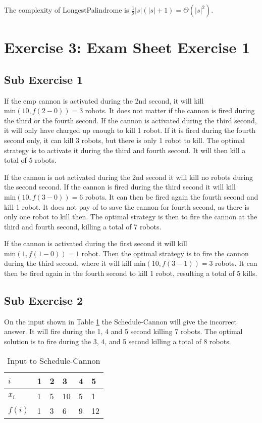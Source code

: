 \documentclass[koma,a4paper]{article}
\begin{document}
The complexity of LongestPalindrome is $\frac{1}{2} |s|(|s| + 1) = \Theta(|s|^2)$.

\pagebreak
\section{Exercise 3: Exam Sheet Exercise 1}
\subsection{Sub Exercise 1}
If the emp cannon is activated during the 2nd second, it will kill $\text{min}(10, f(2 - 0)) = 3$ robots. It does not matter if the cannon is fired during the third or the fourth second. If the cannon is activated during the third second, it will only have charged up enough to kill 1 robot. If it is fired during the fourth second only, it can kill 3 robots, but there is only 1 robot to kill. The optimal strategy is to activate it during the third and fourth second. It will then kill a total of 5 robots.

If the cannon is not activated during the 2nd second it will kill no robots during the second second. If the cannon is fired during the third second it will kill $\text{min}(10, f(3 - 0)) = 6$ robots. It can then be fired again the fourth second and kill 1 robot. It does not pay of to save the cannon for fourth second, as there is only one robot to kill then. The optimal strategy is then to fire the cannon at the third and fourth second, killing a total of 7 robots.

If the cannon is activated during the first second it will kill $\text{min}(1, f(1 - 0)) = 1$ robot. Then the optimal strategy is to fire the cannon during the third second, where it will kill $\text{min}(10, f(3 - 1)) = 3$ robots. It can then be fired again in the fourth second to kill 1 robot, resulting a total of 5 kills.

\subsection{Sub Exercise 2}
On the input shown in Table \ref{tab:shed_cannon_bad_input} the Schedule-Cannon will give the incorrect answer. It will fire during the 1, 4 and 5 second killing 7 robots. The optimal solution is to fire during the 3, 4, and 5 second killing a total of 8 robots.

\begin{table}[htp]%
  \centering
  \begin{tabular}{llllll}
    \toprule
    $i$ & \textbf{1} & \textbf{2} & \textbf{3} & \textbf{4} & \textbf{5} \\
    \midrule
    $x_i$  & 1 & 5 & 10 & 5 & 1 \\
    $f(i)$ & 1 & 3 & 6 & 9 & 12 \\
    \bottomrule
  \end{tabular}
\caption{Input to Schedule-Cannon}
\label{tab:shed_cannon_bad_input}
\end{table}
\end{document}
